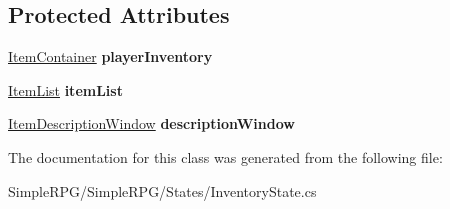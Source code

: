 \subsection*{Protected Attributes}
\begin{DoxyCompactItemize}
\item 
\hypertarget{class_simple_r_p_g_1_1_states_1_1_inventory_state_aa5316f2c76266582d48e44d711d484d8}{\hyperlink{class_simple_r_p_g_1_1_items_1_1_item_container}{Item\-Container} {\bfseries player\-Inventory}}\label{class_simple_r_p_g_1_1_states_1_1_inventory_state_aa5316f2c76266582d48e44d711d484d8}

\item 
\hypertarget{class_simple_r_p_g_1_1_states_1_1_inventory_state_ade61f6d43d5d01beaf81c2542f6a4c80}{\hyperlink{class_simple_r_p_g_1_1_windows_1_1_item_list}{Item\-List} {\bfseries item\-List}}\label{class_simple_r_p_g_1_1_states_1_1_inventory_state_ade61f6d43d5d01beaf81c2542f6a4c80}

\item 
\hypertarget{class_simple_r_p_g_1_1_states_1_1_inventory_state_a82b7015c1fd0c9f7f79bb8eb20f63959}{\hyperlink{class_simple_r_p_g_1_1_windows_1_1_item_description_window}{Item\-Description\-Window} {\bfseries description\-Window}}\label{class_simple_r_p_g_1_1_states_1_1_inventory_state_a82b7015c1fd0c9f7f79bb8eb20f63959}

\end{DoxyCompactItemize}


The documentation for this class was generated from the following file\-:\begin{DoxyCompactItemize}
\item 
Simple\-R\-P\-G/\-Simple\-R\-P\-G/\-States/Inventory\-State.\-cs\end{DoxyCompactItemize}
